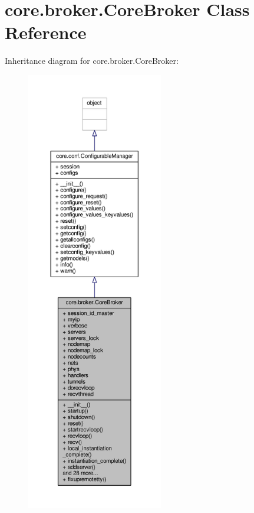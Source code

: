 \hypertarget{classcore_1_1broker_1_1_core_broker}{\section{core.\+broker.\+Core\+Broker Class Reference}
\label{classcore_1_1broker_1_1_core_broker}
}


Inheritance diagram for core.\+broker.\+Core\+Broker\+:
\nopagebreak
\begin{figure}[H]
\begin{center}
\leavevmode
\includegraphics[height=550pt]{classcore_1_1broker_1_1_core_broker__inherit__graph}
\end{center}
\end{figure}


